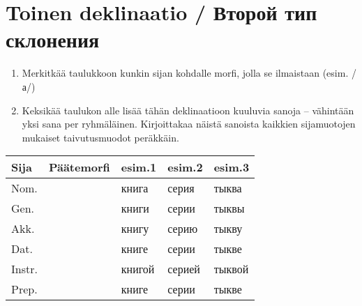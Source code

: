 \documentclass[paper=a4, fontsize=11pt]{scrartcl}
\providecommand{\tightlist}{%
  \setlength{\itemsep}{0pt}\setlength{\parskip}{0pt}}
\begin{document}
\clearpage

\section{Toinen deklinaatio / Второй тип
склонения}\label{toinen-deklinaatio-ux432ux442ux43eux440ux43eux439-ux442ux438ux43f-ux441ux43aux43bux43eux43dux435ux43dux438ux44f}

\begin{enumerate}
\def\labelenumi{\arabic{enumi}.}
\tightlist
\item
  Merkitkää taulukkoon kunkin sijan kohdalle morfi, jolla se ilmaistaan
  (esim. /а/)
\item
  Keksikää taulukon alle lisää tähän deklinaatioon kuuluvia sanoja --
  vähintään yksi sana per ryhmäläinen. Kirjoittakaa näistä sanoista kaikkien
  sijamuotojen mukaiset taivutusmuodot peräkkäin.
\end{enumerate}


{
\begin{longtable}[c]{@{}lllll@{}}
\toprule
Sija & Päätemorfi & esim.1 & esim.2 & esim.3\tabularnewline
\midrule
\endhead
Nom. & & книга & серия & тыква\tabularnewline
Gen. & & книги & серии & тыквы\tabularnewline
Akk. & & книгу & серию & тыкву\tabularnewline
Dat. & & книге & серии & тыкве\tabularnewline
Instr. & & книгой & серией & тыквой\tabularnewline
Prep. & & книге & серии & тыкве\tabularnewline
\bottomrule
\end{longtable}
}

\begin{center}

\vspace{1.1cm} 

\underline{\hspace{12cm}} \\
\vspace{0.5cm}
\underline{\hspace{12cm}} \\
\vspace{0.5cm}
\underline{\hspace{12cm}} \\
\vspace{0.5cm}
\underline{\hspace{12cm}} \\
\vspace{0.5cm}
\underline{\hspace{12cm}} \\
\vspace{0.5cm}
\underline{\hspace{12cm}} \\
\vspace{0.5cm}
\underline{\hspace{12cm}} \\
\vspace{0.5cm}
\underline{\hspace{12cm}} \\
\vspace{0.5cm}
\underline{\hspace{12cm}} \\

\end{center}
\end{document}

